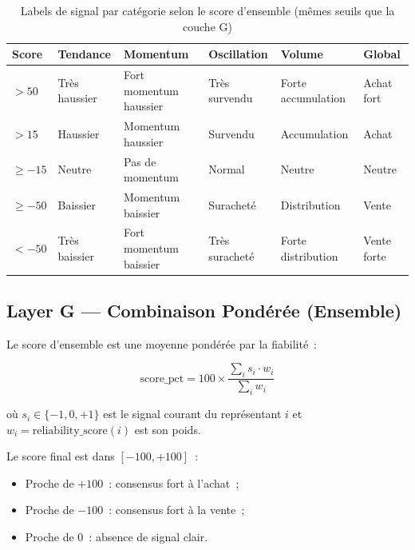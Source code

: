 \begin{table}[H]
\centering
\caption{Labels de signal par catégorie selon le score d'ensemble (mêmes seuils que la couche G)}
\label{tab:labels_signal}
\begin{tabularx}{\linewidth}{@{}lYYYYY@{}}
\toprule
\textbf{Score} & \textbf{Tendance} & \textbf{Momentum} & \textbf{Oscillation} & \textbf{Volume} & \textbf{Global} \\
\midrule
$> 50$         & Très haussier     & Fort momentum haussier & Très survendu & Forte accumulation & Achat fort \\
$> 15$         & Haussier          & Momentum haussier      & Survendu      & Accumulation       & Achat \\
$\geq -15$     & Neutre            & Pas de momentum        & Normal        & Neutre             & Neutre \\
$\geq -50$     & Baissier          & Momentum baissier      & Suracheté     & Distribution       & Vente \\
$< -50$        & Très baissier     & Fort momentum baissier & Très suracheté & Forte distribution & Vente forte \\
\bottomrule
\end{tabularx}
\end{table}

\subsection{Layer G — Combinaison Pondérée (Ensemble)}
\label{sec:signaux_ensemble}

Le score d'ensemble est une moyenne pondérée par la fiabilité~:

\begin{equation}
\text{score\_pct} = 100 \times \frac{\displaystyle\sum_{i} s_i \cdot w_i}{\displaystyle\sum_{i} w_i}
\label{eq:ensemble}
\end{equation}

où $s_i \in \{-1, 0, +1\}$ est le signal courant du représentant $i$ et
$w_i = \text{reliability\_score}(i)$ est son poids.

Le score final est dans $[-100, +100]$~:
\begin{itemize}
    \item Proche de $+100$~: consensus fort à l'achat~;
    \item Proche de $-100$~: consensus fort à la vente~;
    \item Proche de $0$~: absence de signal clair.
\end{itemize}

